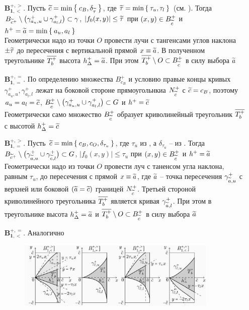 \begin{enumerate}
    \item[$ \bm{B_{1, <}^{+, >}} $.] Пусть $ \widetilde{c} = \min\Set{c_B, \delta_{\widetilde{\tau}}} $, где $ \widetilde\tau = \min\Set{\tau_u, \tau_l} $ (см. ). Тогда $ B_{\widetilde{c}^+} \setminus \big( \gamma_{a_u, u}^+ \cup \gamma_{a_l, l}^+ \big) \subset \gamma $, $ |f_0(x, y)| \le \widetilde\tau $ при $ (x, y) \in B_{\widetilde{c}}^+ $ и $ h^+ = \widetilde{a} = \min\Set{a_u, a_l} $ \\
    Геометрически надо из точки $ O $ провести лучи с тангенсами углов наклона $ \pm\widetilde\tau $ до пересечения с вертикальной прямой $ x \equiv \widetilde{a} $. В полученном треугольнике $ \overline{T_b^+} $ высота $ h_\Delta^+ = \widetilde{a} $. При этом $ \overline{T_b^+} \setminus O \subset B_{\widetilde{c}}^+ $ в силу выбора $ \widetilde{a} $
    \item[$ \bm{B_{1, =}^{+, =}} $.] По определению множества $ B_{c_B}^+ $ и условию  правые концы кривых $ \gamma_{a_u, u}^+, \gamma_{a_l, l}^+ $ лежат на боковой стороне прямоугольнкиа $ N_{\widetilde{c}}^+ $ с $ \widetilde{c} = c_B $, поэтому $ a_u = a_l = \widetilde{c} $, $ B_{\widetilde{c}}^+ \setminus \big( \gamma_{a_u, u}^+ \cup \gamma_{a_l, l}^+ \big) \subset G $ и $ h^+ = \widetilde{c} $ \\
    Геометрически само множество $ B_{\widetilde{c}}^+ $ образует криволинейный треугольник $ \overline{T_b^+} $ с высотой $ h_\Delta^+ = \widetilde{c} $
    \item[$ \bm{B_{1, =}^{+, >}} $.] Пусть $ \widetilde{c} = \min\Set{c_B, c_O, \delta_{\tau_u}} $, где $ \tau_u $ из , а $ \delta_{\tau_u} $ -- из . Тогда $ B_{\widetilde{c}^+} \setminus \big( \gamma_{\widetilde{a}, u}^+ \cup \gamma_{\widetilde{c}, l}^+ \big) \subset G $, $ |f_0(x, y)| \le \tau_u $ при $ (x, y) \in B_{\widetilde{c}}^+ $ и  $ h^+ = \widetilde{a} $ \\
    Геометрически надо из точки $ O $ провести луч с таненсом угла наклона, равным $ \tau_u $, до пересечения с прямой $ x \equiv \widetilde{a} $, где $ \widetilde{a} $ -- точка пересечения $ \gamma_{\widetilde{a}, u}^+ $ с верхней или боковой $ (\widetilde{a} = \widetilde{c}) $ границей $ N_{\widetilde{c}}^+ $. Третьей стороной криволинейного треугольника $ \overline{T_b^+} $ является кривая $ \gamma_{\widetilde{a}, l}^+ $. При этом в треугольнике высота $ h_\Delta^+ = \widetilde{a} $ и $ \overline{T_b^+} \setminus O \subset B_{\widetilde{c}}^+ $ в силу выбора $ \widetilde{a} $
    \item[$ \bm{B_{1, <}^{+, =}} $.] Аналогично

    \begin{figure}[!h]
        \centering
    	\includegraphics[width=0.9\textwidth]{boundary_curves_5}
    \end{figure}
\end{enumerate}

